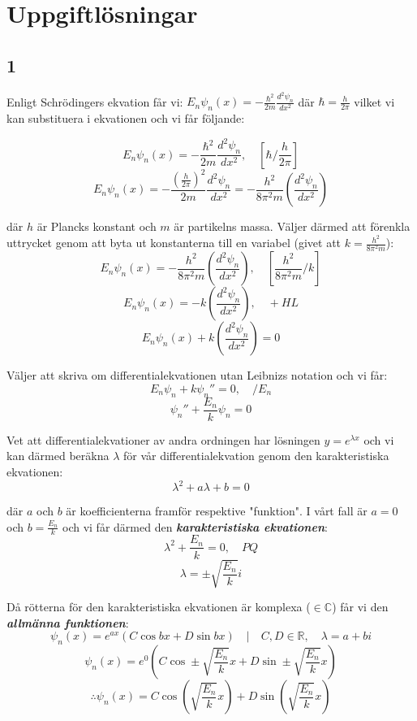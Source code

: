 \documentclass{article}
\newcommand{\shrodequ}{E_n \psi_n(x) = - \frac{\hbar^2}{2m} \frac{d^2 \psi_n}{dx^2}}
\begin{document}
\newpage

\section{Uppgiftlösningar}
\subsection{1}

Enligt Schrödingers ekvation får vi: $\shrodequ$ där $\hbar = \frac{h}{2\pi}$ vilket vi kan substituera i ekvationen och vi får följande:

$$
\shrodequ, \quad \left[\hbar / \frac{h}{2\pi}\right]
$$
$$
E_n\psi_n(x) = - \frac{\left(\frac{h}{2\pi}\right)^2}{2m} \frac{d^2 \psi_n}{dx^2} = - \frac{h^2}{8 \pi^2 m} \left(\frac{d^2 \psi_n}{dx^2}\right)
$$

där $h$ är Plancks konstant och $m$ är partikelns massa. Väljer därmed att förenkla uttrycket genom att byta ut konstanterna till en variabel (givet att $k = \frac{h^2}{8 \pi ^2 m}$):
$$
E_n\psi_n(x) = - \frac{h^2}{8 \pi ^2 m} \left(\frac{d^2 \psi_n}{dx^2}\right), \quad \left[\frac{h^2}{8 \pi ^2 m}/k\right]
$$
$$
E_n\psi_n(x) = -k\left(\frac{d^2 \psi_n}{dx^2}\right), \quad + HL
$$
$$
E_n\psi_n(x) + k\left(\frac{d^2 \psi_n}{dx^2}\right) = 0
$$

Väljer att skriva om differentialekvationen utan Leibnizs notation och vi får:
$$
E_n\psi_n + k \psi_n'' = 0, \quad /E_n 
$$
$$
\psi_n'' + \frac{E_n}{k}\psi_n = 0 
$$

Vet att differentialekvationer av andra ordningen har lösningen $y=e^{\lambda x}$ och vi kan därmed beräkna $\lambda$ för vår differentialekvation genom den karakteristiska ekvationen:
$$
\lambda^2 + a\lambda + b = 0
$$

där $a$ och $b$ är koefficienterna framför respektive "funktion". I vårt fall är $a=0$ och $b = \frac{E_n}{k}$ och vi får därmed den \textbf{\emph{karakteristiska ekvationen}}:
$$
\lambda^2 + \frac{E_n}{k} = 0, \quad PQ	
$$
$$
\lambda = \pm \sqrt{\frac{E_n}{k}}i
$$

Då rötterna för den karakteristiska ekvationen är komplexa ($\in \mathbb{C}$) får vi den \textbf{\emph{allmänna funktionen}}:
$$
\psi_n(x) = e^{ax}\left(C \cos bx + D \sin bx\right) \quad | \quad C,D \in \mathbb{R}, \quad \lambda = a + bi
$$
$$
\psi_n(x) = e^{0}\left( C \cos \pm\sqrt{\frac{E_n}{k}}x + D \sin \pm\sqrt{\frac{E_n}{k}}x \right) 
$$
\begin{equation} \label{psi_gen}
\therefore \psi_n(x) = C \cos \left(\sqrt{\frac{E_n}{k}}x\right) + D \sin \left(\sqrt{\frac{E_n}{k}}x\right)
\end{equation}
\end{document}
